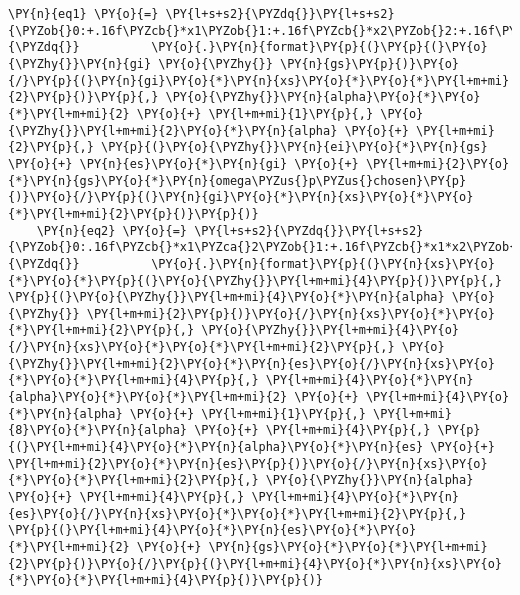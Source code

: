 \begin{Verbatim}[commandchars=\\\{\}]
    \PY{n}{eq1} \PY{o}{=} \PY{l+s+s2}{\PYZdq{}}\PY{l+s+s2}{\PYZob{}0:+.16f\PYZcb{}*x1\PYZob{}1:+.16f\PYZcb{}*x2\PYZob{}2:+.16f\PYZcb{}*x3\PYZob{}3:+.16f\PYZcb{};}\PY{l+s+s2}{\PYZdq{}}          \PY{o}{.}\PY{n}{format}\PY{p}{(}\PY{p}{(}\PY{o}{\PYZhy{}}\PY{n}{gi} \PY{o}{\PYZhy{}} \PY{n}{gs}\PY{p}{)}\PY{o}{/}\PY{p}{(}\PY{n}{gi}\PY{o}{*}\PY{n}{xs}\PY{o}{*}\PY{o}{*}\PY{l+m+mi}{2}\PY{p}{)}\PY{p}{,} \PY{o}{\PYZhy{}}\PY{n}{alpha}\PY{o}{*}\PY{o}{*}\PY{l+m+mi}{2} \PY{o}{+} \PY{l+m+mi}{1}\PY{p}{,} \PY{o}{\PYZhy{}}\PY{l+m+mi}{2}\PY{o}{*}\PY{n}{alpha} \PY{o}{+} \PY{l+m+mi}{2}\PY{p}{,} \PY{p}{(}\PY{o}{\PYZhy{}}\PY{n}{ei}\PY{o}{*}\PY{n}{gs} \PY{o}{+} \PY{n}{es}\PY{o}{*}\PY{n}{gi} \PY{o}{+} \PY{l+m+mi}{2}\PY{o}{*}\PY{n}{gs}\PY{o}{*}\PY{n}{omega\PYZus{}p\PYZus{}chosen}\PY{p}{)}\PY{o}{/}\PY{p}{(}\PY{n}{gi}\PY{o}{*}\PY{n}{xs}\PY{o}{*}\PY{o}{*}\PY{l+m+mi}{2}\PY{p}{)}\PY{p}{)}
    \PY{n}{eq2} \PY{o}{=} \PY{l+s+s2}{\PYZdq{}}\PY{l+s+s2}{\PYZob{}0:.16f\PYZcb{}*x1\PYZca{}2\PYZob{}1:+.16f\PYZcb{}*x1*x2\PYZob{}2:+.16f\PYZcb{}*x1*x3\PYZob{}3:+.16f\PYZcb{}*x1\PYZob{}4:+.16f\PYZcb{}*x2\PYZca{}2\PYZob{}5:+.16f\PYZcb{}*x2*x3\PYZob{}6:+.16f\PYZcb{}*x2\PYZob{}7:+.16f\PYZcb{}*x3\PYZca{}2\PYZob{}8:+.16f\PYZcb{}*x3\PYZob{}9:+.16f\PYZcb{};}\PY{l+s+s2}{\PYZdq{}}          \PY{o}{.}\PY{n}{format}\PY{p}{(}\PY{n}{xs}\PY{o}{*}\PY{o}{*}\PY{p}{(}\PY{o}{\PYZhy{}}\PY{l+m+mi}{4}\PY{p}{)}\PY{p}{,} \PY{p}{(}\PY{o}{\PYZhy{}}\PY{l+m+mi}{4}\PY{o}{*}\PY{n}{alpha} \PY{o}{\PYZhy{}} \PY{l+m+mi}{2}\PY{p}{)}\PY{o}{/}\PY{n}{xs}\PY{o}{*}\PY{o}{*}\PY{l+m+mi}{2}\PY{p}{,} \PY{o}{\PYZhy{}}\PY{l+m+mi}{4}\PY{o}{/}\PY{n}{xs}\PY{o}{*}\PY{o}{*}\PY{l+m+mi}{2}\PY{p}{,} \PY{o}{\PYZhy{}}\PY{l+m+mi}{2}\PY{o}{*}\PY{n}{es}\PY{o}{/}\PY{n}{xs}\PY{o}{*}\PY{o}{*}\PY{l+m+mi}{4}\PY{p}{,} \PY{l+m+mi}{4}\PY{o}{*}\PY{n}{alpha}\PY{o}{*}\PY{o}{*}\PY{l+m+mi}{2} \PY{o}{+} \PY{l+m+mi}{4}\PY{o}{*}\PY{n}{alpha} \PY{o}{+} \PY{l+m+mi}{1}\PY{p}{,} \PY{l+m+mi}{8}\PY{o}{*}\PY{n}{alpha} \PY{o}{+} \PY{l+m+mi}{4}\PY{p}{,} \PY{p}{(}\PY{l+m+mi}{4}\PY{o}{*}\PY{n}{alpha}\PY{o}{*}\PY{n}{es} \PY{o}{+} \PY{l+m+mi}{2}\PY{o}{*}\PY{n}{es}\PY{p}{)}\PY{o}{/}\PY{n}{xs}\PY{o}{*}\PY{o}{*}\PY{l+m+mi}{2}\PY{p}{,} \PY{o}{\PYZhy{}}\PY{n}{alpha} \PY{o}{+} \PY{l+m+mi}{4}\PY{p}{,} \PY{l+m+mi}{4}\PY{o}{*}\PY{n}{es}\PY{o}{/}\PY{n}{xs}\PY{o}{*}\PY{o}{*}\PY{l+m+mi}{2}\PY{p}{,} \PY{p}{(}\PY{l+m+mi}{4}\PY{o}{*}\PY{n}{es}\PY{o}{*}\PY{o}{*}\PY{l+m+mi}{2} \PY{o}{+} \PY{n}{gs}\PY{o}{*}\PY{o}{*}\PY{l+m+mi}{2}\PY{p}{)}\PY{o}{/}\PY{p}{(}\PY{l+m+mi}{4}\PY{o}{*}\PY{n}{xs}\PY{o}{*}\PY{o}{*}\PY{l+m+mi}{4}\PY{p}{)}\PY{p}{)}

\end{Verbatim}
